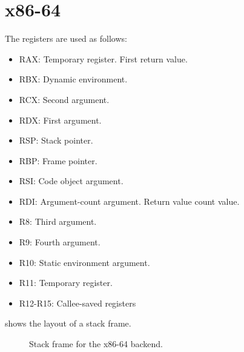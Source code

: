 \chapter{x86-64}
\label{chapter-backend-x86-64}

The registers are used as follows:

\begin{itemize}
\item RAX: Temporary register.  First return value. 
\item RBX: Dynamic environment.
\item RCX: Second argument. 
\item RDX: First argument. 
\item RSP: Stack pointer.
\item RBP: Frame pointer.
\item RSI: Code object argument.
\item RDI: Argument-count argument.  Return value count value.
\item R8: Third argument. 
\item R9: Fourth argument. 
\item R10: Static environment argument.
\item R11: Temporary register.
\item R12-R15: Callee-saved registers
\end{itemize}

 shows the layout of a stack frame. 

\begin{figure}
\begin{center}
\end{center}
\caption{\label{fig-x86-64-stack-frame}
Stack frame for the x86-64 backend.}
\end{figure}

